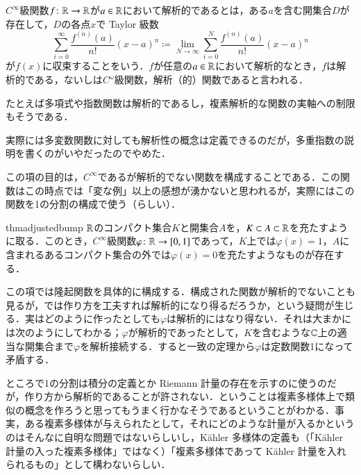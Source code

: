 \begin{defi}
$C^\infty$級関数$f \colon \mathbb{R} \to \mathbb{R}$が$a \in \mathbb{R}$において解析的であるとは，ある$a$を含む開集合$D$が存在して，$D$の各点$x$で Taylor 級数
\begin{equation}
\sum_{i=0}^\infty \frac{f^{(n)}(a)}{n!} (x-a)^n \coloneqq \lim_{N \to \infty} \sum_{i=0}^N \frac{f^{(n)}(a)}{n!} (x-a)^n 
\end{equation}が$f(x)$に収束することをいう．$f$が任意の$a \in \mathbb{R}$において解析的なとき，$f$は解析的である，ないしは$C^\omega$級関数，解析（的）関数であると言われる．
\end{defi}

\begin{que}
たとえば多項式や指数関数は解析的であるし，複素解析的な関数の実軸への制限もそうである．
\end{que}

\begin{que}
実際には多変数関数に対しても解析性の概念は定義できるのだが，多重指数の説明を書くのがいやだったのでやめた．
\end{que}

この項の目的は，$C^\infty$であるが解析的でない関数を構成することである．この関数はこの時点では「変な例」以上の感想が湧かないと思われるが，実際にはこの関数を1の分割の構成で使う（らしい）．

\begin{restatable}[隆起関数の存在]{thm}{adjustedbump}\label{隆起関数の存在}
$\mathbb{R}$のコンパクト集合$K$と開集合$A$を，$K \subset A \subset \mathbb{R}$を充たすように取る．このとき，$C^\infty$級関数$\varphi \colon \mathbb{R} \to [0,1]$であって，$K$上では$\varphi(x) = 1$，$A$に含まれるあるコンパクト集合の外では$\varphi(x) = 0$を充たすようなものが存在する．
\end{restatable}

\begin{que}[*]
この項では隆起関数を具体的に構成する．構成された関数が解析的でないことも見るが，では作り方を工夫すれば解析的になり得るだろうか，という疑問が生じる．実はどのように作ったとしても$\varphi$は解析的にはなり得ない．それは大まかには次のようにしてわかる；$\varphi$が解析的であったとして，$K$を含むような$\mathbb{C}$上の適当な開集合まで$\varphi$を解析接続する．すると一致の定理から$\varphi$は定数関数1になって矛盾する．
\end{que}

\begin{que}[**]
ところで1の分割は積分の定義とか Riemann 計量の存在を示すのに使うのだが，作り方から解析的であることが許されない．ということは複素多様体上で類似の概念を作ろうと思ってもうまく行かなそうであるということがわかる．事実，ある複素多様体が与えられたとして，それにどのような計量が入るかというのはそんなに自明な問題ではないらしいし，K\"ahler 多様体の定義も（「K\"ahler 計量の入った複素多様体」ではなく）「複素多様体であって K\"ahler 計量を入れられるもの」として構わないらしい．
\end{que}

